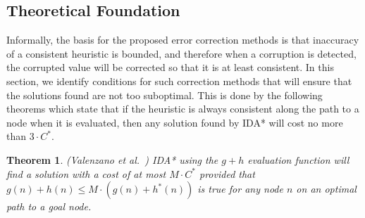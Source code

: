 \documentclass[letterpaper]{article}
\newtheorem{theorem}{Theorem}
\newtheorem{definition}{Definition}
\begin{document}


\subsection{Theoretical Foundation}
Informally, the basis for the proposed error correction methods is that inaccuracy of a consistent heuristic is bounded, and therefore when a corruption is detected, 
the corrupted value will be corrected so that it is at least consistent. 
In this section, we identify conditions for such correction methods that will ensure that the solutions found are not too suboptimal.
This is done by the following theorems which state that if the heuristic is always consistent along the path to a node when it is evaluated, then any solution found by IDA* will cost no more than $3 \cdot C^*$. 


\begin{theorem} (Valenzano et al.~)
IDA* using the $g+h$ evaluation function will find a solution with a cost of at most $M\cdot C^*$ provided that $g(n) + h(n) \leq M \cdot (g(n)+h^*(n))$ is true for any node $n$ on an optimal path to a goal node. %
\label{theorem:rickmas}
\end{theorem}
\end{document}
